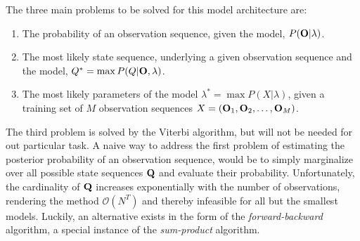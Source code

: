 \documentclass[conference]{IEEEtran}
\begin{document}
The three main problems to be solved for this model architecture are:
\begin{enumerate}
 \item The probability of an observation sequence, given the model, $P({\bf O}|\lambda)$.
 \item The most likely state sequence, underlying a given observation sequence and the model, $Q^* = \max P(Q|{\bf O},\lambda)$.
 \item The most likely parameters of the model $\lambda^* = \max P(X|\lambda)$, given a training set of $M$ observation sequences $X = ({\bf O}_{1}, {\bf O}_{2}, \ldots, {\bf O}_{M} )$.
\end{enumerate}
The third problem is solved by the Viterbi algorithm, but will not be needed for out particular task. A naive way to address the first problem of estimating the posterior probability of an observation sequence, would be to simply marginalize over all possible state sequences ${\bf Q}$ and evaluate their probability. Unfortunately, the cardinality of ${\bf Q}$ increases exponentially with the number of observations, rendering the method $\mathcal{O}(N^{T})$ and thereby infeasible for all but the smallest models. Luckily, an alternative exists in the form of the {\it forward-backward} algorithm, a special instance of the {\it sum-product} algorithm.
\end{document}
